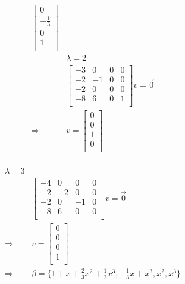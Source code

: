 \documentclass{article}
\begin{document}
\begin{equation*}
\begin{split}
\begin{bmatrix}
            0\\
            -\frac{1}{3}\\
            0\\
            1\\
        \end{bmatrix}\\
        &\lambda=2\\
        &\begin{bmatrix}
            -3&0&0&0\\
            -2&-1&0&0\\
            -2&0&0&0\\
            -8&6&0&1\\
        \end{bmatrix}v=\overrightarrow{0} \\
        \Rightarrow&v=\begin{bmatrix}
            0\\
            0\\
            1\\
            0\\
        \end{bmatrix}\\
    \end{split}
\end{equation*}

\begin{equation*}
    \begin{split}
        \lambda=3\\
        &\begin{bmatrix}
            -4&0&0&0\\
            -2&-2&0&0\\
            -2&0&-1&0\\
            -8&6&0&0\\
        \end{bmatrix}v=\overrightarrow{0}\\
        \Rightarrow&v=\begin{bmatrix}
            0\\
            0\\
            0\\
            1\\
        \end{bmatrix}\\
        \Rightarrow&\beta=\{1+x+\frac{2}{3}x^2+\frac{1}{2}x^3,-\frac{1}{3}x+x^3,x^2,x^3\}
    \end{split}
\end{equation*}
\end{document}
